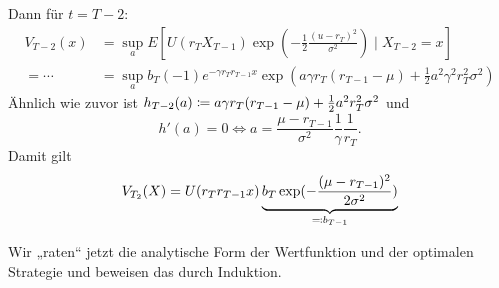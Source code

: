 \documentclass[a4paper,twoside,DIV15,BCOR12mm]{scrbook}
\begin{document}
\begin{beispiel}
Dann für $t=T-2$:
\begin{align*}
V_{T-2}(x) &= \sup_a E[ U(r_T X_{T-1}) \exp(-\frac12 \frac{(u- r_T)^2}{\sigma^2}) \mid X_{T-2} = x] \\
= \cdots &= \sup_a b_T (-1) e^{-\gamma r_T r_{T-1} x} \exp(a\gamma r_T (r_{T-1} - \mu) + \frac12 a^2\gamma^2 r_T^2 \sigma^2)
\end{align*}
Ähnlich wie zuvor ist $h_{T-2}(a) \da a \gamma r_T(r_{T-1} - \mu) + \frac12 a^2r_T^2\sigma^2$ und
\[
h'(a) = 0 \iff a = \frac{\mu-r_{T-1}}{\sigma^2} \frac1\gamma \frac1{r_T}. 
\]
Damit gilt
\begin{align*}
V_{T_2}(X) = U(r_T r_{T-1} x)\underbrace{b_T \exp(-\frac{(\mu - r_{T-1})^2}{2\sigma^2})}_{\ad b_{T-1}}
\end{align*}

Wir „raten“ jetzt die analytische Form der Wertfunktion und der optimalen Strategie und beweisen das durch Induktion.


\end{beispiel}
\end{document}

